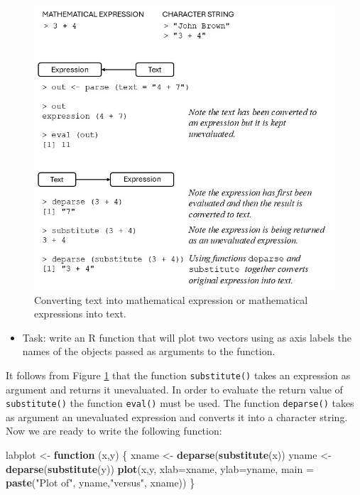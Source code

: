 \documentclass[
]{book}
\newenvironment{Shaded}{\begin{snugshade}}{\end{snugshade}}
\newcommand{\AttributeTok}[1]{\textcolor[rgb]{0.13,0.29,0.53}{#1}}
\newcommand{\ControlFlowTok}[1]{\textcolor[rgb]{0.13,0.29,0.53}{\textbf{#1}}}
\newcommand{\FunctionTok}[1]{\textcolor[rgb]{0.13,0.29,0.53}{\textbf{#1}}}
\newcommand{\NormalTok}[1]{#1}
\newcommand{\OtherTok}[1]{\textcolor[rgb]{0.56,0.35,0.01}{#1}}
\newcommand{\StringTok}[1]{\textcolor[rgb]{0.31,0.60,0.02}{#1}}
\providecommand{\tightlist}{%
  \setlength{\itemsep}{0pt}\setlength{\parskip}{0pt}}
\begin{document}
\begin{figure}
\includegraphics[width=0.8\linewidth]{pics/expressions} \caption{Converting text into mathematical expression or mathematical expressions into text.}\label{fig:expression}
\end{figure}

\begin{itemize}
\tightlist
\item
  Task: write an R function that will plot two vectors using as axis labels the names of the objects passed as arguments to the function.
\end{itemize}

It follows from Figure \ref{fig:expression} that the function \texttt{substitute()} takes an expression as argument and returns it unevaluated. In order to evaluate the return value of \texttt{substitute()} the function \texttt{eval()} must be used. The function \texttt{deparse()} takes as argument an unevaluated expression and converts it into a character string. Now we are ready to write the following function:

\begin{Shaded}
\begin{Highlighting}[]
\NormalTok{labplot }\OtherTok{\textless{}{-}} \ControlFlowTok{function}\NormalTok{ (x,y) }
\NormalTok{\{ xname }\OtherTok{\textless{}{-}} \FunctionTok{deparse}\NormalTok{(}\FunctionTok{substitute}\NormalTok{(x))}
\NormalTok{ yname }\OtherTok{\textless{}{-}} \FunctionTok{deparse}\NormalTok{(}\FunctionTok{substitute}\NormalTok{(y))}
 \FunctionTok{plot}\NormalTok{(x,y, }\AttributeTok{xlab=}\NormalTok{xname, }\AttributeTok{ylab=}\NormalTok{yname, }\AttributeTok{main =} \FunctionTok{paste}\NormalTok{(}\StringTok{"Plot of"}\NormalTok{,}
\NormalTok{        yname,}\StringTok{"versus"}\NormalTok{, xname))}
\NormalTok{\}}
\end{Highlighting}
\end{Shaded}
\end{document}
